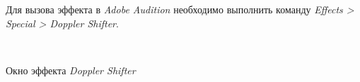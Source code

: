 \documentclass{beamer}
\begin{document}
\begin{frame}
  Для вызова эффекта в \emph{Adobe Audition} необходимо выполнить команду \textit{Effects > Special > Doppler Shifter}.
  
  ~  
  
  \begin{block}{Окно эффекта \emph{Doppler Shifter}}
  \end{block}
\end{frame}
\end{document}
